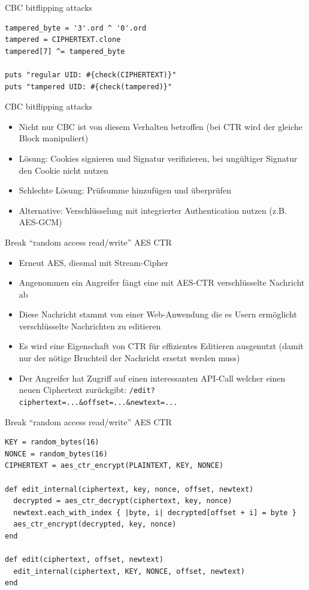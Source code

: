 \documentclass[presentation]{beamer}
\begin{document}
\begin{frame}[fragile,label={sec:orge0e1c5d}]{CBC bitflipping attacks}
 \begin{verbatim}
tampered_byte = '3'.ord ^ '0'.ord
tampered = CIPHERTEXT.clone
tampered[7] ^= tampered_byte

puts "regular UID: #{check(CIPHERTEXT)}"
puts "tampered UID: #{check(tampered)}"
\end{verbatim}
\end{frame}

\begin{frame}[label={sec:org10b07d3}]{CBC bitflipping attacks}
\begin{itemize}
\item Nicht nur CBC ist von diesem Verhalten betroffen (bei CTR wird der
gleiche Block manipuliert)
\item Lösung: Cookies signieren und Signatur verifizieren, bei ungültiger
Signatur den Cookie nicht nutzen
\item Schlechte Lösung: Prüfsumme hinzufügen und überprüfen
\item Alternative: Verschlüsselung mit integrierter Authentication nutzen
(z.B. AES-GCM)
\end{itemize}
\end{frame}

\begin{frame}[fragile,label={sec:org7e62738}]{Break “random access read/write” AES CTR}
 \begin{itemize}
\item Erneut AES, diesmal mit Stream-Cipher
\item Angenommen ein Angreifer fängt eine mit AES-CTR verschlüsselte
Nachricht ab
\item Diese Nachricht stammt von einer Web-Anwendung die es Usern
ermöglicht verschlüsselte Nachrichten zu editieren
\item Es wird eine Eigenschaft von CTR für effizientes Editieren
ausgenutzt (damit nur der nötige Bruchteil der Nachricht ersetzt
werden muss)
\item Der Angreifer hat Zugriff auf einen interessanten API-Call welcher
einen neuen Ciphertext zurückgibt:
\texttt{/edit?ciphertext=...\&offset=...\&newtext=...}
\end{itemize}
\end{frame}

\begin{frame}[fragile,label={sec:org89bbe34}]{Break “random access read/write” AES CTR}
 \begin{verbatim}
KEY = random_bytes(16)
NONCE = random_bytes(16)
CIPHERTEXT = aes_ctr_encrypt(PLAINTEXT, KEY, NONCE)

def edit_internal(ciphertext, key, nonce, offset, newtext)
  decrypted = aes_ctr_decrypt(ciphertext, key, nonce)
  newtext.each_with_index { |byte, i| decrypted[offset + i] = byte }
  aes_ctr_encrypt(decrypted, key, nonce)
end

def edit(ciphertext, offset, newtext)
  edit_internal(ciphertext, KEY, NONCE, offset, newtext)
end
\end{verbatim}
\end{frame}
\end{document}
